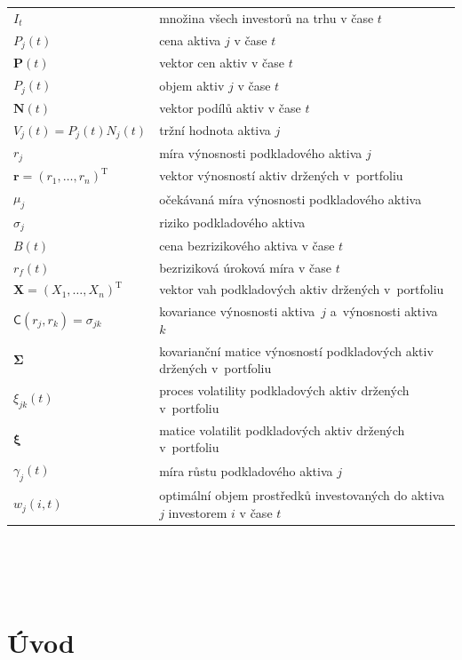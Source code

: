 \documentclass[a4paper,12pt]{report}
\theoremstyle{definition} \newtheorem{definice}[veta]{Definice}
\theoremstyle{remark}
\begin{document}
   \begin{tabular}{p{4cm} p{9.3cm}}
   $I_t$ 								& množina všech investorů na trhu v čase $t$\\
   $P_j(t)$                             &   cena aktiva $j$ v čase $t$ \\
   $\boldsymbol{P}(t)$                             &   vektor cen aktiv v čase $t$\\
   $P_j(t)$                             &   objem aktiv $j$ v čase $t$ \\
   $\boldsymbol{N}(t)$     &   vektor podílů aktiv v čase $t$\\
   $V_j(t)=P_j(t)N_j(t)$       &  tržní hodnota aktiva $j$\\
   $r_j$  								& míra výnosnosti podkladového aktiva $j$\\
   $\boldsymbol{r}=(r_1,\dots,r_n)^\mathrm{T}$  		& vektor výnosností aktiv držených v~portfoliu\\
   $\mu_j$ 								& očekávaná míra výnosnosti podkladového aktiva\\
   $\sigma_j$								& riziko podkladového aktiva\\
   $B(t)$ 								& cena bezrizikového aktiva v čase $t$\\
   $r_f(t)$ 								& bezriziková úroková míra v čase $t$\\
   $\boldsymbol{X}=(X_1,\dots,X_n)^\mathrm{T}$		& vektor vah podkladových aktiv držených v~portfoliu\\
   $\mathsf{C}(r_j,r_k)=\sigma_{jk}$				& kovariance výnosnosti aktiva~$j$ a~výnosnosti aktiva~$k$\\
   $\boldsymbol{\Sigma}$						& kovarianční matice výnosností podkladových aktiv držených v~portfoliu\\
   $\xi_{jk}(t)$ 							& proces volatility podkladových aktiv držených v~portfoliu\\
   $\boldsymbol{\xi}$						& matice volatilit podkladových aktiv držených v~portfoliu\\
   $\gamma_j(t)$ 							& míra růstu  podkladového aktiva $j$\\
   $w_{j}(i,t)$ 							& optimální objem prostředků investovaných do aktiva $j$ investorem $i$ v čase $t$\\
   \end{tabular}\\\\\\
%
%
%


\chapter*{Úvod} 
\pagestyle{plain}
\setcounter{page}{1}
\end{document}
